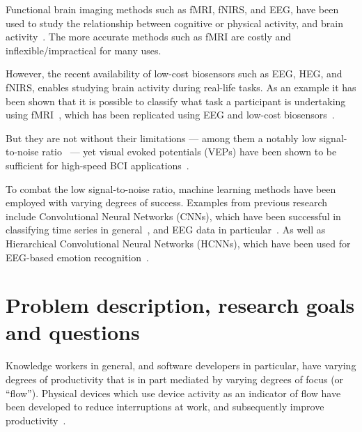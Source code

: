 \documentclass{IEEEtran}
\begin{document}
\begin{refsection}
Functional brain imaging methods such as fMRI, fNIRS, and EEG, have been used to study the relationship between cognitive or physical activity, and brain activity~\cite{floyd_decoding_2017,hong_classification_2015, fucci_replication_2019}. The more accurate methods such as fMRI are costly and inflexible/impractical for many uses.

However, the recent availability of low-cost biosensors such as EEG, HEG, and fNIRS, enables studying brain activity during real-life tasks. As an example it has been shown that it is possible to classify what task a participant is undertaking using fMRI~\cite{floyd_decoding_2017}, which has been replicated using EEG and low-cost biosensors~\cite{fucci_replication_2019}.

But they are not without their limitations --- among them a notably low signal-to-noise ratio~\cite{mcfarland_eeg-based_2017} --- yet visual evoked potentials (VEPs) have been shown to be sufficient for high-speed BCI applications~\cite{spuler_high-speed_2017}.

To combat the low signal-to-noise ratio, machine learning methods have been employed with varying degrees of success. Examples from previous research include Convolutional Neural Networks (CNNs), which have been successful in classifying time series in general~\cite{zhao_convolutional_2017}, and EEG data in particular~\cite{schirrmeister_deep_2017}. As well as Hierarchical Convolutional Neural Networks (HCNNs), which have been used for EEG-based emotion recognition~\cite{li_hierarchical_2018}.



\section{Problem description, research goals and questions}



Knowledge workers in general, and software developers in particular, have varying degrees of productivity that is in part mediated by varying degrees of focus (or ``flow''). Physical devices which use device activity as an indicator of flow have been developed to reduce interruptions at work, and subsequently improve productivity~\cite{zuger_reducing_2017}.


\end{refsection}
\end{document}
